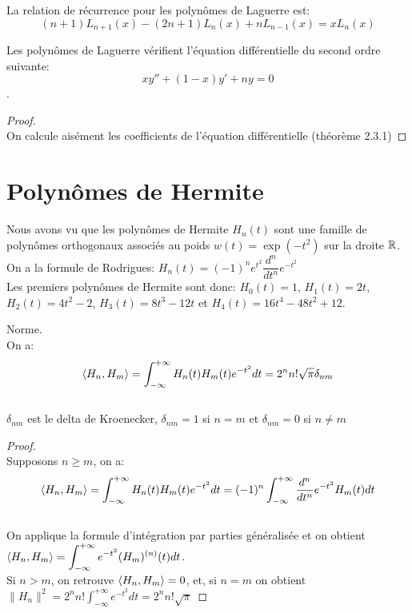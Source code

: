 \bprop
$ $\\La relation de récurrence pour les polynômes de Laguerre est:$$(n+1)L_{n+1}(x)-(2n+1)L_n(x)+nL_{n-1}(x)=xL_n(x)$$
\eprop

\bprop
$ $\\Les polynômes de Laguerre vérifient l'équation différentielle du second ordre suivante:$$ xy''+(1-x)y'+ny=0$$.
\eprop

\begin{proof}
$ $\\On calcule aisément les coefficients de l'équation différentielle (théorème 2.3.1)
\end{proof}

\section{Polynômes de Hermite}
Nous avons vu que les polynômes de Hermite $ H_{n}(t) $ sont une famille de polynômes orthogonaux associés au poids $ w(t)=\exp(-t^{2}) $ sur la droite $ \mathbb R $.
\\On a la formule de Rodrigues: $ H_{n}(t)=(-1)^{n}e^{t^{2}}\dfrac{d^{n}}{dt^{n}}e^{-t^{2}} $
\\Les premiers polynômes de Hermite sont donc: $ H_{0}(t)=1 $, $ H_{1}(t)=2t $, $ H_{2}(t)=4t^{2}-2 $, $ H_{3}(t)=8t^{3}-12t $ et $ H_{4}(t)=16t^{4}-48t^{2}+12.$

\bprop
Norme.\\On a:
$$\langle H_{n},H_{m} \rangle=\int_{-\infty}^{+\infty}H_{n}(t)H_{m}(t)e^{-t^{2}}dt=2^{n}n!\sqrt{\pi}\delta_{nm}$$
\\$\delta_{nm}$ est le delta de Kroenecker, $\delta_{nm}=1$ si $n=m$ et $\delta_{nm}=0$ si $n \neq m$
\eprop

\begin{proof}
$ $\\
Supposons $n\geqslant m$, on a:
$$\langle H_{n},H_{m}\rangle=\int_{-\infty}^{+\infty}H_{n}(t)H_{m}(t)e^{-t^{2}}dt=(-1)^{n}\int_{-\infty}^{+\infty}\dfrac{d^{n}}{dt^{n}}e^{-t^{2}}H_{m}(t)dt$$
\\On applique la formule d'intégration par parties généralisée et on obtient
\\$\displaystyle{\langle H_{n},H_{m}\rangle=\int_{-\infty}^{+\infty}e^{-t^{2}}(H_{m})^{(n)}(t)dt}$.
\\Si $ n>m $, on retrouve $ \langle H_{n},H_{m}\rangle=0 $, et, si $ n=m $ on obtient $\displaystyle{ \|H_{n}\|^{2} = 2^{n}n!\int_{-\infty}^{+\infty}e^{-t^{2}}dt=2^{n}n!\sqrt{\pi} }$
\end{proof}

